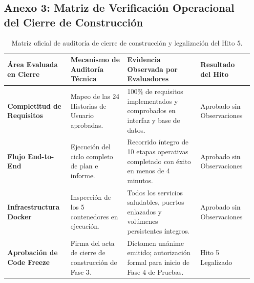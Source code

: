 \documentclass[12pt,a4paper]{article}
\begin{document}
\subsection*{Anexo 3: Matriz de Verificación Operacional del Cierre de Construcción}
\begin{table}[H]
\centering
\small
\renewcommand{\arraystretch}{1.15}
\begin{tabularx}{\textwidth}{|>{\hsize=0.75\hsize\raggedright\arraybackslash\bfseries\footnotesize}X|>{\hsize=1.25\hsize\raggedright\arraybackslash\footnotesize}X|>{\hsize=1.35\hsize\raggedright\arraybackslash\footnotesize}X|>{\hsize=0.65\hsize\centering\arraybackslash\footnotesize}X|}
\hline
\rowcolor{tableheader}
\textbf{Área Evaluada en Cierre} & \textbf{Mecanismo de Auditoría Técnica} & \textbf{Evidencia Observada por Evaluadores} & \textbf{Resultado del Hito} \\
\hline
Completitud de Requisitos & Mapeo de las 24 Historias de Usuario aprobadas. & 100\% de requisitos implementados y comprobados en interfaz y base de datos. & Aprobado sin Observaciones \\
\hline
Flujo End-to-End & Ejecución del ciclo completo de plan e informe. & Recorrido íntegro de 10 etapas operativas completado con éxito en menos de 4 minutos. & Aprobado sin Observaciones \\
\hline
Infraestructura Docker & Inspección de los 5 contenedores en ejecución. & Todos los servicios saludables, puertos enlazados y volúmenes persistentes íntegros. & Aprobado sin Observaciones \\
\hline
Aprobación de Code Freeze & Firma del acta de cierre de construcción de Fase 3. & Dictamen unánime emitido; autorización formal para inicio de Fase 4 de Pruebas. & Hito 5 Legalizado \\
\hline
\end{tabularx}
\caption{Matriz oficial de auditoría de cierre de construcción y legalización del Hito 5.}
\end{table}
\end{document}

